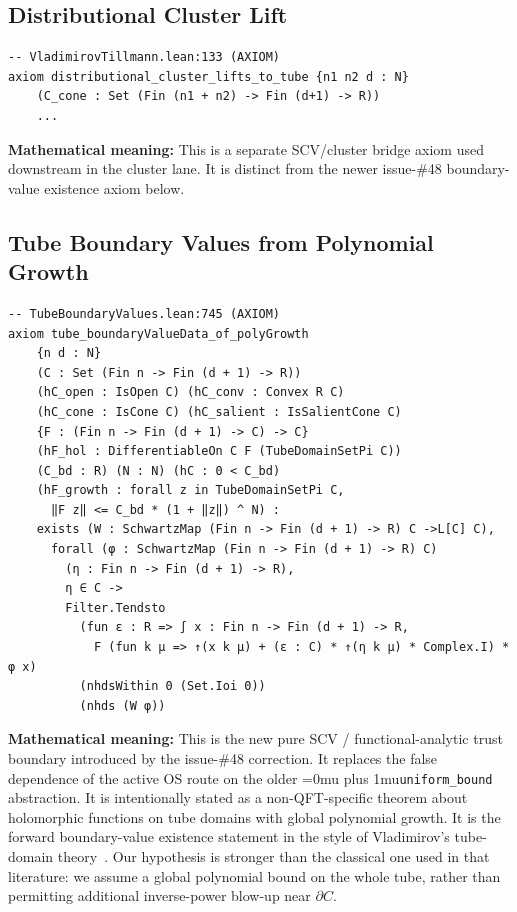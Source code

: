 \documentclass[11pt,a4paper]{article}
\newcommand{\leanname}[1]{\begingroup\Urlmuskip=0mu plus 1mu\relax\nolinkurl{#1}\endgroup}
\begin{document}
\subsection{Distributional Cluster Lift}

\begin{lstlisting}[style=leanaxiom]
-- VladimirovTillmann.lean:133 (AXIOM)
axiom distributional_cluster_lifts_to_tube {n1 n2 d : N}
    (C_cone : Set (Fin (n1 + n2) -> Fin (d+1) -> R))
    ...
\end{lstlisting}

\noindent\textbf{Mathematical meaning:}
This is a separate SCV/cluster bridge axiom used downstream in the cluster lane.
It is distinct from the newer issue-\#48 boundary-value existence axiom below.

\subsection{Tube Boundary Values from Polynomial Growth}

\begin{lstlisting}[style=leanaxiom]
-- TubeBoundaryValues.lean:745 (AXIOM)
axiom tube_boundaryValueData_of_polyGrowth
    {n d : N}
    (C : Set (Fin n -> Fin (d + 1) -> R))
    (hC_open : IsOpen C) (hC_conv : Convex R C)
    (hC_cone : IsCone C) (hC_salient : IsSalientCone C)
    {F : (Fin n -> Fin (d + 1) -> C) -> C}
    (hF_hol : DifferentiableOn C F (TubeDomainSetPi C))
    (C_bd : R) (N : N) (hC : 0 < C_bd)
    (hF_growth : forall z in TubeDomainSetPi C,
      ‖F z‖ <= C_bd * (1 + ‖z‖) ^ N) :
    exists (W : SchwartzMap (Fin n -> Fin (d + 1) -> R) C ->L[C] C),
      forall (φ : SchwartzMap (Fin n -> Fin (d + 1) -> R) C)
        (η : Fin n -> Fin (d + 1) -> R),
        η ∈ C ->
        Filter.Tendsto
          (fun ε : R => ∫ x : Fin n -> Fin (d + 1) -> R,
            F (fun k μ => ↑(x k μ) + (ε : C) * ↑(η k μ) * Complex.I) * φ x)
          (nhdsWithin 0 (Set.Ioi 0))
          (nhds (W φ))
\end{lstlisting}

\noindent\textbf{Mathematical meaning:}
This is the new pure SCV / functional-analytic trust boundary introduced by the
issue-\#48 correction. It replaces the false dependence of the active OS route
on the older \leanname{uniform\_bound} abstraction. It is intentionally stated
as a non-QFT-specific theorem about holomorphic functions on tube domains with
global polynomial growth. It is the forward boundary-value existence statement
in the style of Vladimirov's tube-domain theory~\cite{Vlad}. Our hypothesis is
stronger than the classical one used in that literature: we assume a global
polynomial bound on the whole tube, rather than permitting additional
inverse-power blow-up near \(\partial C\).
\end{document}
